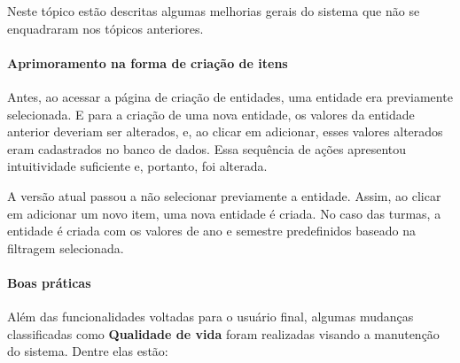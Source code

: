  \label{ssssec:Gerais}

Neste tópico estão descritas algumas melhorias gerais do sistema que não se enquadraram nos tópicos anteriores.

\paragraph*{Aprimoramento na forma de criação de itens}

Antes, ao acessar a página de criação de entidades, uma entidade era previamente selecionada. E para a criação de uma nova entidade, os valores da entidade anterior deveriam ser alterados, e, ao clicar em adicionar, esses valores alterados eram cadastrados no banco de dados. Essa sequência de ações apresentou intuitividade suficiente e, portanto, foi alterada.

A versão atual passou a não selecionar previamente a entidade. Assim, ao clicar em adicionar um novo item, uma nova entidade é criada. No caso das turmas, a entidade é criada com os valores de ano e semestre predefinidos baseado na filtragem selecionada.

\paragraph*{Boas práticas}

Além das funcionalidades voltadas para o usuário final, algumas mudanças classificadas como \textbf{Qualidade de vida} foram realizadas visando a manutenção do sistema. Dentre elas estão:

